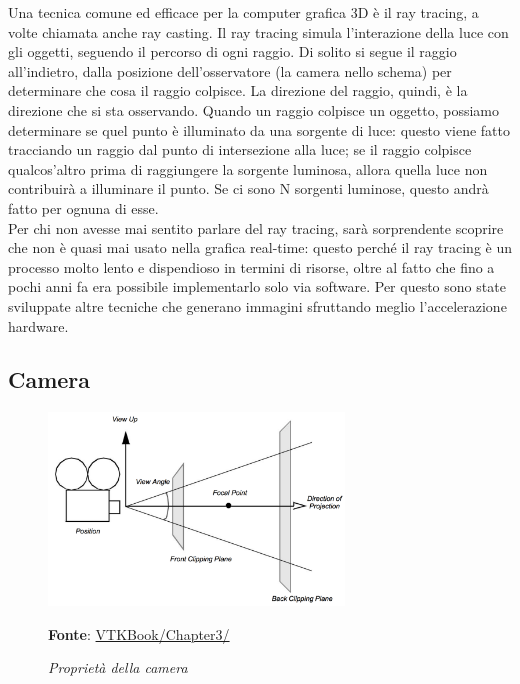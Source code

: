 Una tecnica comune ed efficace per la computer grafica 3D è il ray tracing, a volte chiamata anche ray casting. Il ray tracing simula l'interazione della luce con gli oggetti, seguendo il percorso di ogni raggio. Di solito si segue il raggio all'indietro, dalla posizione dell'osservatore (la camera nello schema) per determinare che cosa il raggio colpisce. La direzione del raggio, quindi, è la direzione che si sta osservando. Quando un raggio colpisce un oggetto, possiamo determinare se quel punto è illuminato da una sorgente di luce: questo viene fatto tracciando un raggio dal punto di intersezione alla luce; se il raggio colpisce qualcos'altro prima di raggiungere la sorgente luminosa, allora quella luce non contribuirà a illuminare il punto. Se ci sono N sorgenti luminose, questo andrà fatto per ognuna di esse.
\\
Per chi non avesse mai sentito parlare del ray tracing, sarà sorprendente scoprire che non è quasi mai usato nella grafica real-time: questo perché il ray tracing è un processo molto lento e dispendioso in termini di risorse, oltre al fatto che fino a pochi anni fa era possibile implementarlo solo via software. Per questo sono state sviluppate altre tecniche che generano immagini sfruttando meglio l'accelerazione hardware.

\subsection{Camera}
\begin{figure}[h]
    \centering
    \includegraphics[width=0.7\textwidth]{immagini/volumerendering/camera.png}
    \caption{\textit{Proprietà della camera}}
    \textbf{Fonte}: \href{https://lorensen.github.io/VTKExamples/site/VTKBook/03Chapter3/}{VTKBook/Chapter3/}
    \label{fig: Proprietà Camera}
\end{figure}

